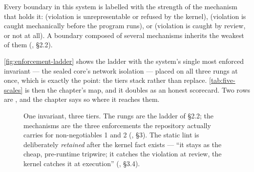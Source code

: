 \begin{principle}
Every boundary in this system is labelled with the strength of the mechanism that
holds it: \tstruct{} (violation is unrepresentable or refused by the kernel),
\tstatic{} (violation is caught mechanically before the program runs), or
\tconv{} (violation is caught by review, or not at all). A boundary composed of
several mechanisms inherits the weakest of them
(, \S 2.2).
\end{principle}

\autoref{fig:enforcement-ladder} shows the ladder with the system's single most
enforced invariant --- the sealed core's network isolation --- placed on all three
rungs at once, which is exactly the point: the tiers stack rather than replace.
\autoref{tab:five-scales} is then the chapter's map, and it doubles as an honest
scorecard. Two rows are \tconv{}, and the chapter says so where it reaches them.

\begin{figure}[t]
  \centering
  
  \caption[The enforcement ladder]{One invariant, three tiers. The rungs are the
    ladder of  \S 2.2; the mechanisms are the three
    enforcements the repository actually carries for non-negotiables 1 and 2
    (, \S 3). The static lint is deliberately
    \emph{retained} after the kernel fact exists --- ``it stays as the cheap,
    pre-runtime tripwire; it catches the violation at review, the kernel catches it
    at execution'' (, \S 3.4).}
  \label{fig:enforcement-ladder}
\end{figure}

